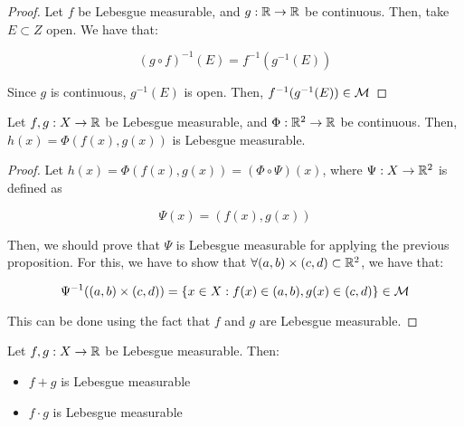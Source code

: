 \begin{proof}
    Let $f$ be Lebesgue measurable, and $g: \mathbb{R} \to \mathbb{R}$ be continuous. Then, take
    $E \subset Z$ open. We have that:

    $$(g \circ f)^{-1}(E) = f^{-1}(g^{-1}(E))$$

    Since $g$ is continuous, $g^{-1}(E)$ is open. Then, $f^{-1}(g^{-1}(E)) \in \mathcal{M}$
\end{proof}

\begin{fproposition}
    Let $f, g: X \to \mathbb{R}$ be Lebesgue measurable, and $\Phi: \mathbb{R}^2 \to \mathbb{R}$ be continuous.
    Then, $h(x) = \Phi(f(x), g(x))$ is Lebesgue measurable. 
\end{fproposition}

\begin{proof}
    Let $h(x) = \Phi(f(x), g(x)) = (\Phi \circ \Psi)(x)$, where $\Psi: X \to \mathbb{R}^2$ is defined as

    $$\Psi(x) = (f(x), g(x))$$

    Then, we should prove that $\Psi$ is Lebesgue measurable for applying the previous proposition.
    For this, we have to show that $\forall (a, b) \times (c, d) \subset \mathbb{R}^2$, we have that:

    $$\Psi^{-1}((a, b) \times (c, d)) = \{x \in X: f(x) \in (a, b), g(x) \in (c, d)\} \in \mathcal{M}$$

    This can be done using the fact that $f$ and $g$ are Lebesgue measurable.

\end{proof}

\begin{fcorollary}
    Let $f, g: X \to \mathbb{R}$ be Lebesgue measurable. Then:
    \vspace{1em}
    \begin{itemize}
        \item $f + g$ is Lebesgue measurable
        \vspace{1em}
        \item $f \cdot g$ is Lebesgue measurable
    \end{itemize}

\end{fcorollary}

\vspace{1em}

